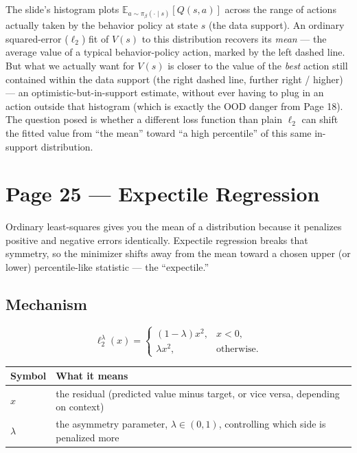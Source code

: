 \documentclass[11pt]{article}
\begin{document}
The slide's histogram plots $\mathbb{E}_{a\sim\pi_\beta(\cdot\mid s)}[Q(s,a)]$ across the range of actions actually taken by the behavior policy at state $s$ (the data support). An ordinary squared-error ($\ell_2$) fit of $V(s)$ to this distribution recovers its \emph{mean} --- the average value of a typical behavior-policy action, marked by the left dashed line. But what we actually want for $V(s)$ is closer to the value of the \emph{best} action still contained within the data support (the right dashed line, further right / higher) --- an optimistic-but-in-support estimate, without ever having to plug in an action outside that histogram (which is exactly the OOD danger from Page 18). The question posed is whether a different loss function than plain $\ell_2$ can shift the fitted value from ``the mean'' toward ``a high percentile'' of this same in-support distribution.

\section*{Page 25 --- Expectile Regression}

Ordinary least-squares gives you the mean of a distribution because it penalizes positive and negative errors identically. Expectile regression breaks that symmetry, so the minimizer shifts away from the mean toward a chosen upper (or lower) percentile-like statistic --- the ``expectile.''

\subsection*{Mechanism}

\[
\ell_2^\lambda(x) = \begin{cases} (1-\lambda)x^2, & x < 0, \\ \lambda x^2, & \text{otherwise.} \end{cases}
\]

\begin{center}
\begin{tabular}{@{}ll@{}}
\toprule
Symbol & What it means \\
\midrule
$x$ & the residual (predicted value minus target, or vice versa, depending on context) \\
$\lambda$ & the asymmetry parameter, $\lambda\in(0,1)$, controlling which side is penalized more \\
\bottomrule
\end{tabular}
\end{center}
\end{document}
